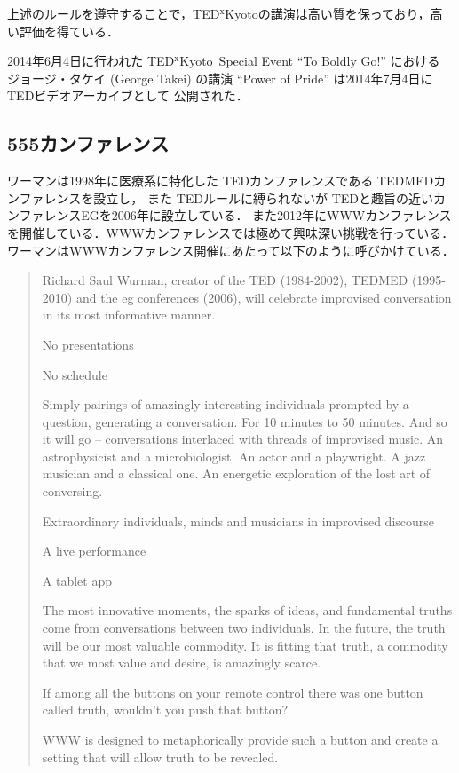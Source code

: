 \documentclass[submit,techreq,jkeyword,noauthor]{ipsj}
\newcommand{\TED}{\textrm{TED}}
\newcommand{\TEDMED}{\textrm{TEDMED}}
\newcommand{\TEDx}{\TED${}^{\textrm{x}}$}
\newcommand{\TEDxKyoto}{\TEDx\textrm{Kyoto}}
\begin{document}
上述のルールを遵守することで，\TEDxKyoto の講演は高い質を保っており，高い評価を得ている．\cite{ml}

2014年6月4日に行われた \TEDxKyoto\ Special Event ``To Boldly Go!'' における
ジョージ・タケイ (George Takei) の講演 ``Power of Pride'' は2014年7月4日に \TED ビデオアーカイブとして
公開された．

\subsection{555カンファレンス}


ワーマンは1998年に医療系に特化した \TED カンファレンスである \TEDMED カンファレンスを設立し，
また \TED ルールに縛られないが \TED と趣旨の近いカンファレンスEGを2006年に設立している．
また2012年にWWWカンファレンスを開催している．WWWカンファレンスでは極めて興味深い挑戦を行っている．
ワーマンはWWWカンファレンス開催にあたって以下のように呼びかけている．\cite{wwwweb}

\begin{quote}
Richard Saul Wurman, creator of the TED (1984-2002), TEDMED (1995-2010) and the eg 
conferences (2006), will celebrate improvised conversation in its most informative manner.

No presentations

No schedule

Simply pairings of amazingly interesting individuals prompted by a question, generating a 
conversation. For 10 minutes to 50 minutes. And so it will go – conversations interlaced 
with threads of improvised music. An astrophysicist and a microbiologist. An actor and a 
playwright. A jazz musician and a classical one. An energetic exploration of the lost art 
of conversing.

Extraordinary individuals,
minds and musicians in improvised discourse

A live performance

A tablet app

The most innovative moments, the sparks of ideas, and fundamental truths come from 
conversations between two individuals.
In the future, the truth will be our most valuable commodity. It is fitting that truth, 
a commodity that we most value and desire, is amazingly scarce.

If among all the buttons on your remote control there was one button called truth, 
wouldn't you push that button?

WWW is designed to metaphorically provide such a button and create a setting that 
will allow truth to be revealed.	
\end{quote}
\end{document}

